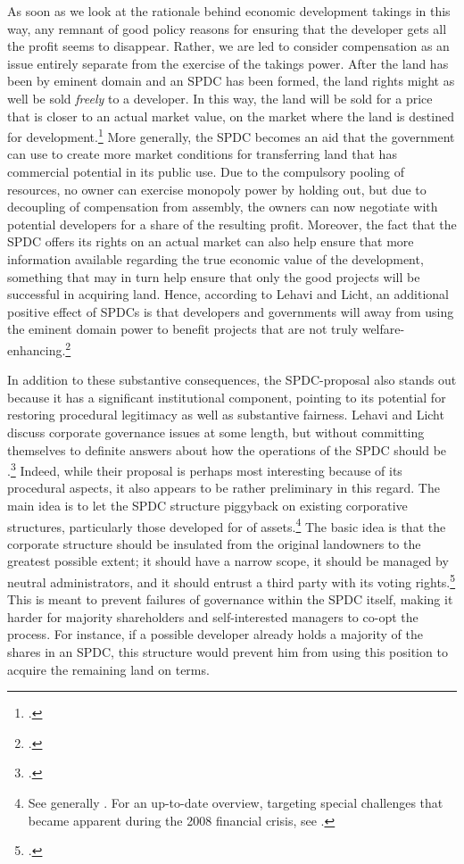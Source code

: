As soon as we look at the rationale behind economic development takings in this way, any remnant of good policy reasons for ensuring that the developer gets all the profit seems to disappear. Rather, we are led to consider compensation as an issue entirely separate from the exercise of the takings power. After the land has been  by eminent domain and an SPDC has been formed, the land rights might as well be sold {\it freely} to a developer. In this way, the land will be sold for a price that is closer to an actual market value, on the market where the land is destined for development.\footcite[1735-1736]{lehavi07} More generally, the SPDC becomes an aid that the government can use to create more  market conditions for transferring land that has commercial potential in its public use. Due to the compulsory pooling of resources, no owner can exercise monopoly power by holding out, but due to decoupling of compensation from assembly, the owners can now negotiate with potential developers for a share of the resulting profit. Moreover, the fact that the SPDC offers its rights on an actual market can also help ensure that more information  available regarding the true economic value of the development, something that may in turn help ensure that only the good projects will be successful in acquiring land. Hence, according to Lehavi and Licht, an additional positive effect of SPDCs is that developers and governments will away from using the eminent domain power to benefit projects that are not truly welfare-enhancing.\footcite[1735-1736]{lehavi07}

In addition to these substantive consequences, the SPDC-proposal also stands out because it has a significant institutional component, pointing to its potential for restoring procedural legitimacy as well as substantive fairness. Lehavi and Licht discuss corporate governance issues at some length, but without committing themselves to definite answers about how the operations of the SPDC should be .\footcite[1040-1048]{lehavi07} Indeed, while their proposal is perhaps most interesting because of its procedural aspects, it also appears to be rather preliminary in this regard. The main idea is to let the SPDC structure piggyback on existing corporative structures, particularly those developed for  of assets.\footnote{See generally \cite{schwarcz94}. For an up-to-date overview, targeting special challenges that became apparent during the 2008 financial crisis, see \cite{schwarcz13}.} The basic idea is that the corporate structure should be insulated from the original landowners to the greatest possible extent; it should have a narrow scope, it should be managed by neutral administrators, and it should entrust a third party with its voting rights.\footcite[1742]{lehavi07} This is meant to prevent failures of governance within the SPDC itself, making it harder for majority shareholders and self-interested managers to co-opt the process. For instance, if a possible developer already holds a majority of the shares in an SPDC, this structure would prevent him from using this position to acquire the remaining land on  terms. 

